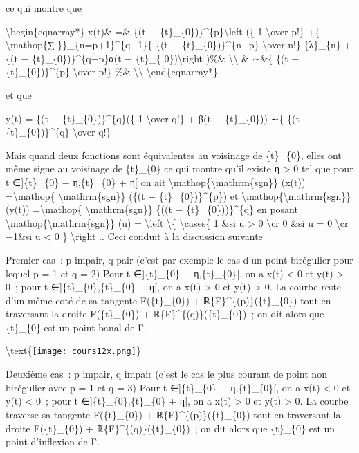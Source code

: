 \documentclass[]{article}
\begin{document}
ce qui montre que

\textbackslash{}begin\{eqnarray*\} x(t)\& =\& \{(t −
\{t\}\_\{0\})\}\^{}\{p\}\textbackslash{}left (\{ 1 \textbackslash{}over
p!\} +\{ \textbackslash{}mathop\{∑ \}\}\_\{n=p+1\}\^{}\{q−1\}\{ \{(t −
\{t\}\_\{0\})\}\^{}\{n−p\} \textbackslash{}over n!\} \{λ\}\_\{n\} + \{(t
− \{t\}\_\{0\})\}\^{}\{q−p\}α(t − \{t\}\_\{ 0\})\textbackslash{}right
)\%\& \textbackslash{}\textbackslash{} \& ∼\&\{ \{(t −
\{t\}\_\{0\})\}\^{}\{p\} \textbackslash{}over p!\} \%\&
\textbackslash{}\textbackslash{} \textbackslash{}end\{eqnarray*\}

et que

y(t) = \{(t − \{t\}\_\{0\})\}\^{}\{q\}(\{ 1 \textbackslash{}over q!\} +
β(t − \{t\}\_\{0\})) ∼\{ \{(t − \{t\}\_\{0\})\}\^{}\{q\}
\textbackslash{}over q!\}

Mais quand deux fonctions sont équivalentes au voisinage de
\{t\}\_\{0\}, elles ont même signe au voisinage de \{t\}\_\{0\} ce qui
montre qu'il existe η \textgreater{} 0 tel que pour t ∈{]}\{t\}\_\{0\} −
η,\{t\}\_\{0\} + η{[} on ait
\textbackslash{}mathop\{\textbackslash{}mathrm\{sgn\}\} (x(t))
=\textbackslash{}mathop\{ \textbackslash{}mathrm\{sgn\}\} (\{(t −
\{t\}\_\{0\})\}\^{}\{p\}) et
\textbackslash{}mathop\{\textbackslash{}mathrm\{sgn\}\} (y(t))
=\textbackslash{}mathop\{ \textbackslash{}mathrm\{sgn\}\} \{((t −
\{t\}\_\{0\}))\}\^{}\{q\} en posant
\textbackslash{}mathop\{\textbackslash{}mathrm\{sgn\}\} (u) =
\textbackslash{}left \textbackslash{}\{ \textbackslash{}cases\{ 1 \&si u
\textgreater{} 0 \textbackslash{}cr 0 \&si u = 0 \textbackslash{}cr
−1\&si u \textless{} 0 \} \textbackslash{}right .. Ceci conduit à la
discussion suivante

Premier cas~: p impair, q pair (c'est par exemple le cas d'un point
birégulier pour lequel p = 1 et q = 2) Pour t ∈{]}\{t\}\_\{0\} −
η,\{t\}\_\{0\}{[}, on a x(t) \textless{} 0 et y(t) \textgreater{} 0~;
pour t ∈{]}\{t\}\_\{0\},\{t\}\_\{0\} + η{[}, on a x(t) \textgreater{} 0
et y(t) \textgreater{} 0. La courbe reste d'un même coté de sa tangente
F(\{t\}\_\{0\}) + ℝ\{F\}\^{}\{(p)\}(\{t\}\_\{0\}) tout en traversant la
droite F(\{t\}\_\{0\}) + ℝ\{F\}\^{}\{(q)\}(\{t\}\_\{0\})~; on dit alors
que \{t\}\_\{0\} est un point banal de Γ.

\textbackslash{}text\{\texttt{[image: cours12x.png]}\}

Deuxième cas~: p impair, q impair (c'est le cas le plus courant de point
non birégulier avec p = 1 et q = 3) Pour t ∈{]}\{t\}\_\{0\} −
η,\{t\}\_\{0\}{[}, on a x(t) \textless{} 0 et y(t) \textless{} 0~; pour
t ∈{]}\{t\}\_\{0\},\{t\}\_\{0\} + η{[}, on a x(t) \textgreater{} 0 et
y(t) \textgreater{} 0. La courbe traverse sa tangente F(\{t\}\_\{0\}) +
ℝ\{F\}\^{}\{(p)\}(\{t\}\_\{0\}) tout en traversant la droite
F(\{t\}\_\{0\}) + ℝ\{F\}\^{}\{(q)\}(\{t\}\_\{0\})~; on dit alors que
\{t\}\_\{0\} est un point d'inflexion de Γ.
\end{document}
